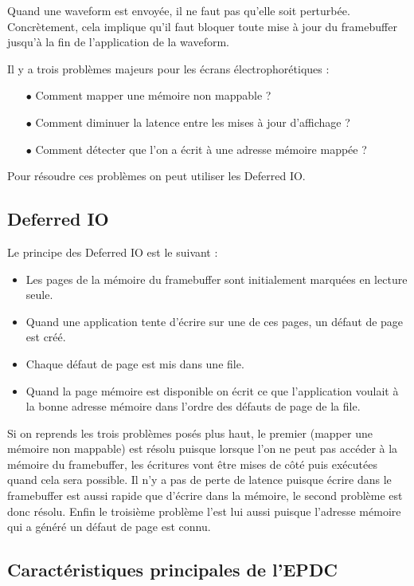Quand une waveform est envoyée, il ne faut pas qu'elle soit perturbée. Concrètement, cela implique qu'il faut bloquer toute mise à jour du framebuffer jusqu'à la fin de l'application de la waveform.

Il y a trois problèmes majeurs pour les écrans électrophorétiques :
\begin{itemize}
	\item[$\bullet$] Comment mapper une mémoire non mappable ?
	\item[$\bullet$] Comment diminuer la latence entre les mises à jour d'affichage ?
	\item[$\bullet$] Comment détecter que l'on a écrit à une adresse mémoire mappée ?
\end{itemize}

Pour résoudre ces problèmes on peut utiliser les Deferred IO.

\subsection{Deferred IO}

Le principe des Deferred IO est le suivant :
\begin{itemize}
\renewcommand{\labelitemi}{$\bullet$}
	\item Les pages de la mémoire du framebuffer sont initialement marquées en lecture seule.
	\item Quand une application tente d'écrire sur une de ces pages, un défaut de page est créé.
	\item Chaque défaut de page est mis dans une file.
	\item Quand la page mémoire est disponible on écrit ce que l'application voulait à la bonne adresse mémoire dans l'ordre des défauts de page de la file. 
\end{itemize} 

Si on reprends les trois problèmes posés plus haut, le premier (mapper une mémoire non mappable) est résolu puisque lorsque l'on ne peut pas accéder à la mémoire du framebuffer, les écritures vont être mises de côté puis exécutées quand cela sera possible. 
Il n'y a pas de perte de latence puisque écrire dans le framebuffer est aussi rapide que d'écrire dans la mémoire, le second problème est donc résolu.
Enfin le troisième problème l'est lui aussi puisque l'adresse mémoire qui a généré un défaut de page est connu.
\subsection{Caractéristiques principales de l'EPDC}

